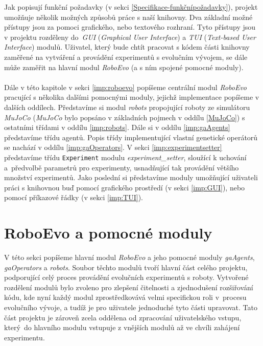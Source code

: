 Jak popisují funkční požadavky (v sekci \ref{Specifikace-funkčnípožadavky}),
projekt umožňuje několik možných způsobů práce s naší knihovny. Dva základní
možné přístupy jsou za pomoci grafického, nebo textového rozhraní. Tyto
přístupy jsou v projektu rozděleny do~\emph{GUI} (\emph{Graphical User
Interface}) a \emph{TUI} (\emph{Text-based User Interface}) modulů. Uživatel,
který bude chtít pracovat s kódem části knihovny zaměřené na vytváření a
provádění experimentů s evolučním vývojem, se dále může zaměřit na hlavní modul
\emph{RoboEvo} (a s ním spojené pomocné moduly).

\paragraph{} 
Dále v této kapitole v sekci \ref{imp:roboevo} popíšeme centrální modul
\emph{RoboEvo} pracující s několika dalšími pomocnými moduly, jejichž
implementace popíšeme v dalších oddílech. Představíme si modul \emph{robots}
propojující roboty ze simulátoru \emph{MuJoCo} (\emph{MuJoCo} bylo popsáno v
základních pojmech v oddílu \ref{MuJoCo}) s ostatními třídami v oddílu
\ref{imp:robots}. Dále si v oddílu \ref{imp:gaAgents} představíme třídu agentů.
Popis třídy implementující vlastní genetické operátorů se nachází v oddílu
\ref{imp:gaOperators}. V sekci \ref{imp:experimentsetter} představíme třídu
\texttt{Experiment} modulu \emph{experiment\_setter}, sloužící k uchování
a~předvolbě parametrů pro experimenty, usnadňující tak provádění většího
množství experimentů. Jako poslední si představíme moduly umožňující uživateli
práci s knihovnou buď pomocí grafického prostředí (v sekci \ref{imp:GUI}), nebo
pomocí příkazové řádky (v sekci \ref{imp:TUI}). 

\section{RoboEvo a pomocné moduly}
V této sekci popíšeme hlavní modul \emph{RoboEvo} a jeho pomocné moduly
\emph{gaAgents}, \emph{gaOperators} a \emph{robots}. Soubor těchto modulů tvoří
hlavní část celého projektu, podporující celý proces provádění evolučních
experimentů s roboty. Vytvořené rozdělení modulů bylo zvoleno pro zlepšení
čitelnosti a zjednodušení rozšiřování kódu, kde nyní každý modul
zprostředkovává velmi specifickou roli v~procesu evolučního vývoje, a tudíž je
pro uživatele jednoduché tyto části upravovat. Tato část projektu je zároveň
zcela oddělena od zpracování uživatelského vstupu, který~do hlavního modulu
vstupuje z vnějších modulů až ve chvíli zahájení experimentu. 


